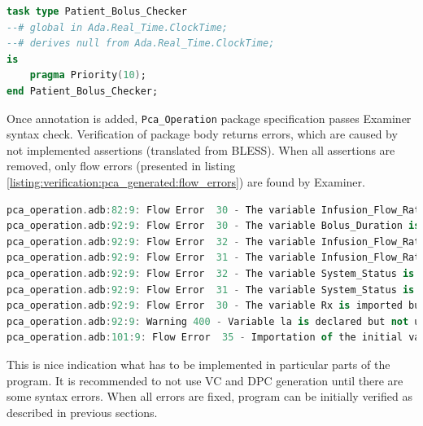 \singlespacing
\begin{lstlisting}[language=ada, frame=single, gobble=0, caption={Undischarged Verification Condition from sum.siv file}]
task type Patient_Bolus_Checker
--# global in Ada.Real_Time.ClockTime;
--# derives null from Ada.Real_Time.ClockTime;
is
    pragma Priority(10);
end Patient_Bolus_Checker;
\end{lstlisting}
\label{listing:verification:pca_generated:patient_bolus_checker}
\doublespacing

Once annotation is added, \lstinline{Pca_Operation} package specification passes Examiner syntax check. Verification of package body returns errors, which are caused by not implemented assertions (translated from BLESS). When all assertions are removed, only flow errors (presented in listing \ref{listing:verification:pca_generated:flow_errors}) are found by Examiner. 

\singlespacing
\begin{lstlisting}[language=ada, frame=single, gobble=0, caption={Flow errors returned by Examiner for \lstinline{Pca_Operation} package body}]
pca_operation.adb:82:9: Flow Error  30 - The variable Infusion_Flow_Rate is imported but neither referenced nor exported.
pca_operation.adb:92:9: Flow Error  30 - The variable Bolus_Duration is imported but neither referenced nor exported.
pca_operation.adb:92:9: Flow Error  32 - The variable Infusion_Flow_Rate is neither imported nor defined.
pca_operation.adb:92:9: Flow Error  31 - The variable Infusion_Flow_Rate is exported but not (internally) defined.
pca_operation.adb:92:9: Flow Error  32 - The variable System_Status is neither imported nor defined.
pca_operation.adb:92:9: Flow Error  31 - The variable System_Status is exported but not (internally) defined.
pca_operation.adb:92:9: Flow Error  30 - The variable Rx is imported but neither referenced nor exported.
pca_operation.adb:92:9: Warning 400 - Variable la is declared but not used.
pca_operation.adb:101:9: Flow Error  35 - Importation of the initial value of variable Ada.Real_Time.ClockTime is ineffective.
\end{lstlisting}
\label{listing:verification:pca_generated:flow_errors}
\doublespacing

This is nice indication what has to be implemented in particular parts of the program. It is recommended to not use VC and DPC generation until there are some syntax errors. When all errors are fixed, program can be initially verified as described in previous sections.


